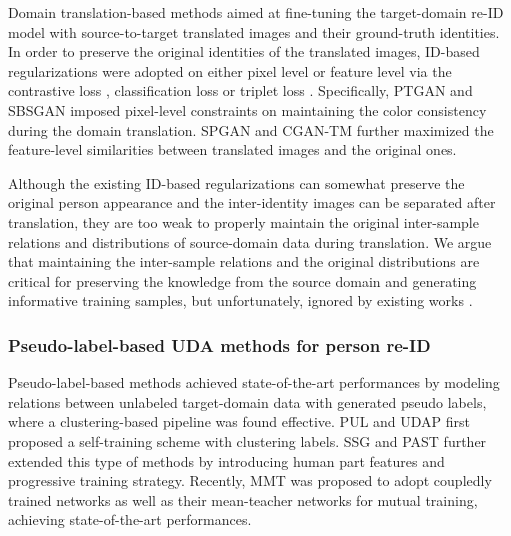 \documentclass[journal]{IEEEtran}
\begin{document}
Domain translation-based methods \cite{deng2018image,wei2018person,deng2018similarity,chen2019instance,tang2020cgan,huang2019sbsgan} aimed at fine-tuning the target-domain re-ID model with source-to-target translated images and their ground-truth identities.
In order to preserve the original identities of the translated images,
ID-based regularizations were adopted on either pixel level \cite{wei2018person,huang2019sbsgan} or feature level \cite{deng2018image,deng2018similarity,chen2019instance,tang2020cgan} via the contrastive loss \cite{deng2018image}, classification loss \cite{deng2018similarity,chen2019instance,zou2020joint} or triplet loss \cite{tang2020cgan}.
Specifically, PTGAN \cite{wei2018person}  {and SBSGAN \cite{huang2019sbsgan}} imposed pixel-level constraints on maintaining the color consistency during the domain translation.
SPGAN \cite{deng2018image}  {and CGAN-TM \cite{tang2020cgan}} further maximized the feature-level similarities between translated images and the original ones.

Although the existing ID-based regularizations can somewhat preserve the original person appearance and the inter-identity images can be separated after translation,
they are too weak to properly maintain the original inter-sample relations and distributions of source-domain data during translation.
We argue that maintaining the inter-sample relations and the original distributions are critical for preserving the knowledge from the source domain and generating informative training samples, but unfortunately, ignored by existing works \cite{deng2018image,wei2018person,deng2018similarity,chen2019instance,huang2019sbsgan,tang2020cgan}.


\subsubsection{\textbf{Pseudo-label-based UDA methods for person re-ID}}


Pseudo-label-based methods \cite{fan2018unsupervised,song2018unsupervised,zhang2019self,yang2019selfsimilarity,ge2020mutual,yu2019unsupervised,zhong2019invariance}
achieved state-of-the-art performances by modeling relations between unlabeled target-domain data with generated pseudo labels, where a clustering-based pipeline was found effective.
PUL \cite{fan2018unsupervised}  {and UDAP \cite{song2018unsupervised}} first proposed a self-training scheme with clustering labels.
SSG \cite{yang2019selfsimilarity} and PAST \cite{zhang2019self} further extended this type of methods by introducing human part features and progressive training strategy.
Recently, MMT \cite{ge2020mutual} was proposed to adopt coupledly trained networks as well as their mean-teacher networks for mutual training, achieving state-of-the-art performances.
\end{document}

